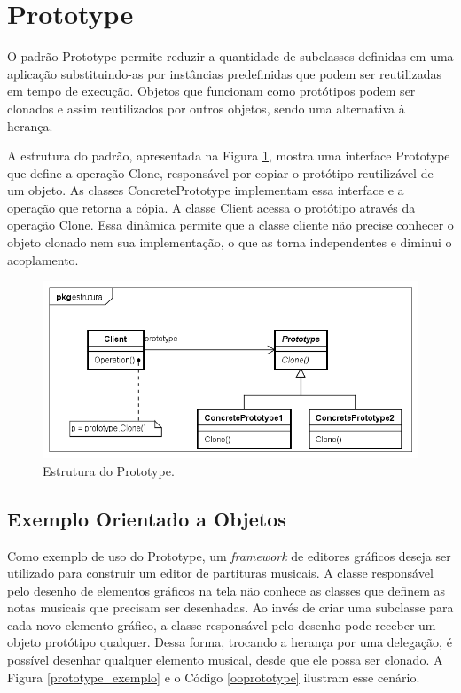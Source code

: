 \section{Prototype}

O padrão Prototype permite reduzir a quantidade 
de subclasses definidas em uma aplicação 
substituindo-as por instâncias predefinidas 
que podem ser reutilizadas em tempo de 
execução. Objetos que funcionam como 
protótipos podem ser clonados e assim 
reutilizados por outros objetos, sendo uma 
alternativa à herança. \cite{gamma:1995}

A estrutura do padrão, apresentada na Figura 
\ref{prototype_struct}, mostra uma interface 
Prototype que define a operação Clone, responsável 
por copiar o protótipo reutilizável de um objeto. 
As classes ConcretePrototype implementam essa 
interface e a operação que retorna a cópia. 
A classe Client acessa o protótipo através da operação 
Clone. Essa dinâmica permite que a classe cliente 
não precise conhecer o objeto clonado nem sua 
implementação, o que as torna independentes e 
diminui o acoplamento.

\begin{figure}[htb]
	\caption{\label{prototype_struct}Estrutura do Prototype.}
	\begin{center}
	    \includegraphics[scale=0.5]{5_padroes-contexto-funcional/5.1_criacionais/5.1.4_prototype/prototype_estrutura.png}
	\end{center}
\end{figure}


\subsection*{Exemplo Orientado a Objetos}

Como exemplo de uso do Prototype, um 
\textit{framework} de editores gráficos deseja 
ser utilizado para construir um editor de 
partituras musicais. A classe responsável pelo 
desenho de elementos gráficos na tela não 
conhece as classes que definem as notas musicais que 
precisam ser desenhadas. Ao invés de criar uma 
subclasse para cada novo elemento gráfico, 
a classe responsável pelo desenho 
pode receber um objeto protótipo qualquer. 
Dessa forma, trocando a herança 
por uma delegação, é possível desenhar qualquer 
elemento musical, desde que ele possa ser 
clonado. A Figura \ref{prototype_exemplo} e 
o Código \ref{ooprototype} ilustram esse cenário.


